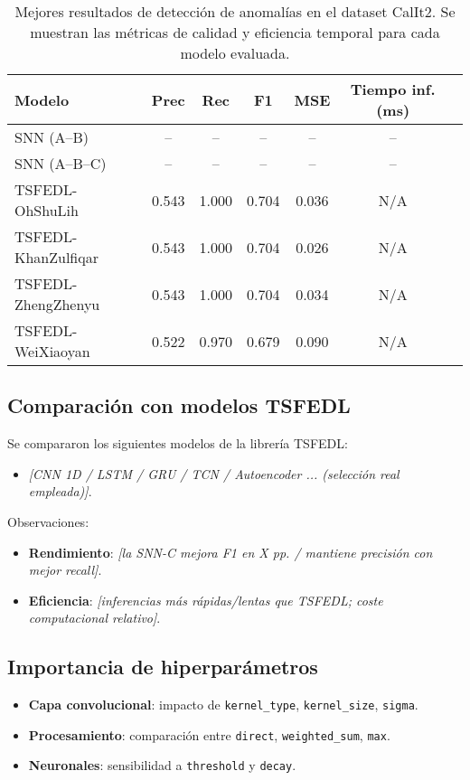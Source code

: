 \begin{table}[htbp]
\centering
\small
\begin{tabular}{lcccccc}
\hline\hline
\textbf{Modelo} & \textbf{Prec} & \textbf{Rec} & \textbf{F1} & \textbf{MSE} & \textbf{Tiempo inf. (ms)} \\
\hline
SNN (A--B) & -- & -- & -- & -- & -- \\
SNN (A--B--C) & -- & -- & -- & -- & -- \\
TSFEDL-OhShuLih & 0.543 & 1.000 & 0.704 & 0.036 & N/A \\
TSFEDL-KhanZulfiqar & 0.543 & 1.000 & 0.704 & 0.026 & N/A \\
TSFEDL-ZhengZhenyu & 0.543 & 1.000 & 0.704 & 0.034 & N/A \\
TSFEDL-WeiXiaoyan & 0.522 & 0.970 & 0.679 & 0.090 & N/A \\
\hline\hline
\end{tabular}
\caption{Mejores resultados de detección de anomalías en el dataset CalIt2. Se muestran las métricas de calidad y eficiencia temporal para cada modelo evaluada.}
\label{tab:resultados-iops}
\end{table}

\subsection{Comparación con modelos TSFEDL}
Se compararon los siguientes modelos de la librería TSFEDL:
\begin{itemize}
    \item \textit{[CNN 1D / LSTM / GRU / TCN / Autoencoder ... (selección real empleada)]}.
\end{itemize}
Observaciones:
\begin{itemize}
    \item \textbf{Rendimiento}: \textit{[la SNN-C mejora F1 en X pp. / mantiene precisión con mejor recall]}.
    \item \textbf{Eficiencia}: \textit{[inferencias más rápidas/lentas que TSFEDL; coste computacional relativo]}.
\end{itemize}

\subsection{Importancia de hiperparámetros}
\begin{itemize}
    \item \textbf{Capa convolucional}: impacto de \texttt{kernel\_type}, \texttt{kernel\_size}, \texttt{sigma}.
    \item \textbf{Procesamiento}: comparación entre \texttt{direct}, \texttt{weighted\_sum}, \texttt{max}.
    \item \textbf{Neuronales}: sensibilidad a \texttt{threshold} y \texttt{decay}.
\end{itemize}

